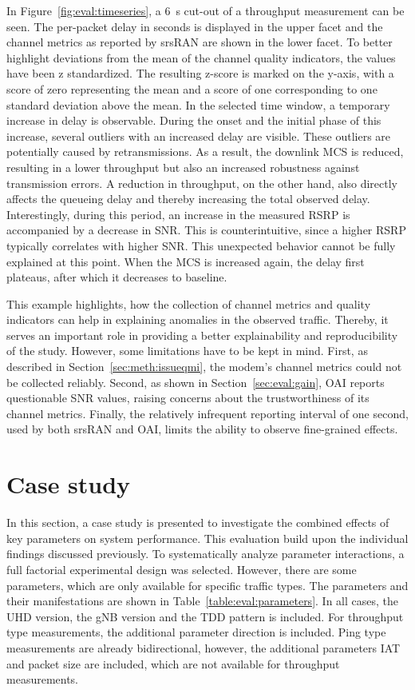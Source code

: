 In Figure~\ref{fig:eval:timeseries}, a \SI{6}{\second} cut-out of a throughput measurement can be seen.
The per-packet delay in seconds is displayed in the upper facet and the channel metrics as reported by srsRAN are shown in the lower facet.
To better highlight deviations from the mean of the channel quality indicators, the values have been z standardized.
The resulting z-score is marked on the y-axis, with a score of zero representing the mean and a score of one corresponding to one standard deviation above the mean.
In the selected time window, a temporary increase in delay is observable.
During the onset and the initial phase of this increase, several outliers with an increased delay are visible.
These outliers are potentially caused by retransmissions.
As a result, the downlink \gls{MCS} is reduced, resulting in a lower throughput but also an increased robustness against transmission errors.
A reduction in throughput, on the other hand, also directly affects the queueing delay and thereby increasing the total observed delay.
Interestingly, during this period, an increase in the measured \gls{RSRP} is accompanied by a decrease in \gls{SNR}.
This is counterintuitive, since a higher \gls{RSRP} typically correlates with higher \gls{SNR}.
This unexpected behavior cannot be fully explained at this point.
When the \gls{MCS} is increased again, the delay first plateaus, after which it decreases to baseline.

This example highlights, how the collection of channel metrics and quality indicators can help in explaining
anomalies in the observed traffic.
Thereby, it serves an important role in providing a better explainability and reproducibility of the study.
However, some limitations have to be kept in mind.
First, as described in Section~\ref{sec:meth:issueqmi}, the modem's channel metrics could not be collected reliably.
Second, as shown in Section~\ref{sec:eval:gain}, OAI reports questionable \gls{SNR} values,
raising concerns about the trustworthiness of its channel metrics.
Finally, the relatively infrequent reporting interval of one second, used by both srsRAN and OAI,
limits the ability to observe fine-grained effects.



\section{Case study}\label{sec:eval:case}


In this section, a case study is presented to investigate the combined effects of key parameters on system performance.
This evaluation build upon the individual findings discussed previously.
To systematically analyze parameter interactions, a full factorial experimental design was selected.
However, there are some parameters, which are only available for specific traffic types.
The parameters and their manifestations are shown in Table~\ref{table:eval:parameters}.
In all cases, the \gls{UHD} version, the \gls{gNB} version and the \gls{TDD} pattern is included.
For throughput type measurements, the additional parameter direction is included.
Ping type measurements are already bidirectional, however, the additional parameters \gls{IAT} and packet size are included, which are not available for throughput measurements.

